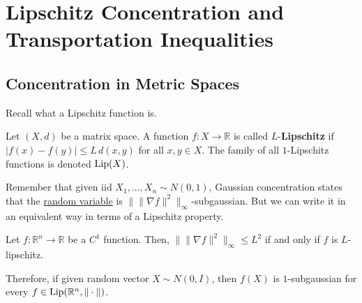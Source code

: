 \section{Lipschitz Concentration and Transportation Inequalities}

\subsection{Concentration in Metric Spaces}

  Recall what a Lipschitz function is. 

  \begin{definition}
    \label{def:lipschitz-function}
  Let $(X, d)$ be a matrix space. A function $f: X \rightarrow \mathbb{R}$ is called $L$-\textbf{Lipschitz} if $|f(x) - f(y)| \leq L \, d(x, y)$ for all $x, y \in X$. The family of all $1$-Lipschitz functions is denoted $\operatorname{Lip}(X)$. 
  \end{definition}

  Remember that given iid $X_1, \ldots, X_n \sim N(0, 1)$, Gaussian concentration states that the \hyperref[prob-def:random-variable]{random variable} is $\| \|\nabla f\|^2 \|_\infty$-subgaussian. But we can write it in an equivalent way in terms of a Lipschitz property. 

  \begin{lemma}
    \label{thm:gradient-bound-characterizes-lipschitz-functions}
  Let $f: \mathbb{R}^n \rightarrow \mathbb{R}$ be a $C^1$ function. Then, $\| \|\nabla f\|^2 \|_\infty \leq L^2$ if and only if $f$ is $L$-lipschitz. 
  \end{lemma}

  Therefore, if given random vector $X \sim N(0, I)$, then $f(X)$ is $1$-subgaussian for every $f \in \operatorname{Lip}(\mathbb{R}^n, \|\cdot\|)$. 

